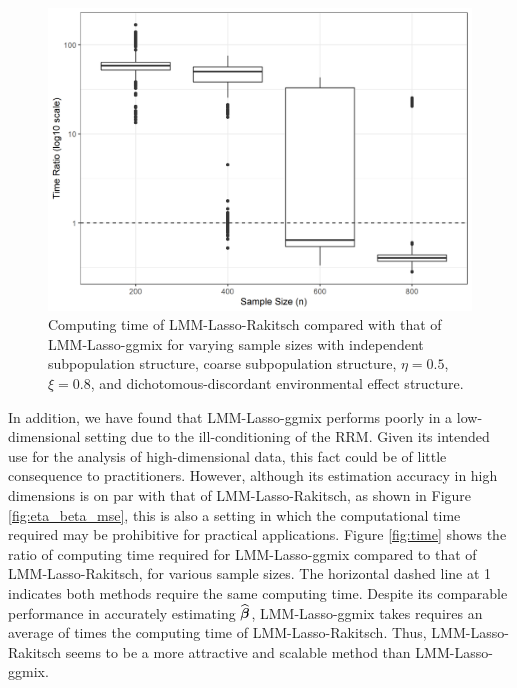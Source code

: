 \begin{figure}[H]
    \centering
    \includegraphics[scale = 0.8]{figures/time_ratio_box.png}
    \caption{ Computing time of LMM-Lasso-Rakitsch compared with that of LMM-Lasso-ggmix for varying sample sizes with independent subpopulation structure, coarse subpopulation structure, $\eta = 0.5$, $\xi = 0.8$, and dichotomous-discordant environmental effect structure.}
    \label{fig:time_box}
\end{figure}



In addition, we have found that LMM-Lasso-ggmix performs poorly in a low-dimensional setting due to the ill-conditioning of the RRM. Given its intended use for the analysis of high-dimensional data, this fact could be of little consequence to practitioners. However, although its estimation accuracy in high dimensions is on par with that of LMM-Lasso-Rakitsch, as shown in Figure \ref{fig:eta_beta_mse}, this is also a setting in which the computational time required may be prohibitive for practical applications.  Figure \ref{fig:time} shows the ratio of computing time required for LMM-Lasso-ggmix compared to that of LMM-Lasso-Rakitsch, for various sample sizes. The horizontal dashed line at 1 indicates both methods require the same computing time. Despite its comparable performance in accurately estimating $\widehat{\boldsymbol{\beta}{}}$, LMM-Lasso-ggmix takes requires an average of  times the computing time of LMM-Lasso-Rakitsch. Thus, LMM-Lasso-Rakitsch seems to be a more attractive and scalable method than LMM-Lasso-ggmix.


